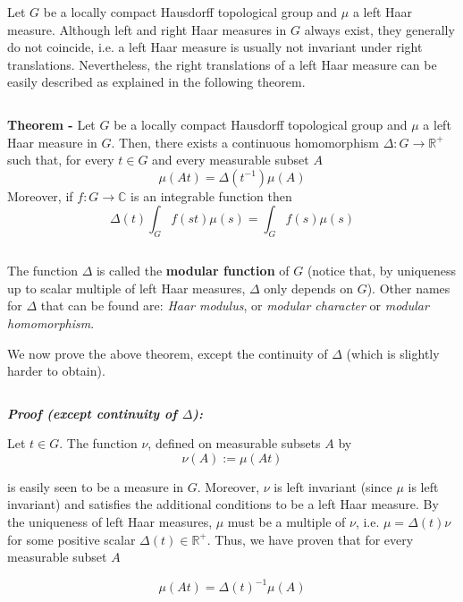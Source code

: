 \documentclass[12pt]{article}
\begin{document}
Let $G$ be a locally compact Hausdorff topological group and $\mu$ a left Haar measure. Although left and right Haar measures in $G$ always exist, they generally do not coincide, i.e. a left Haar measure is usually not invariant under right translations. Nevertheless, the right translations of a left Haar measure can be easily described as explained in the following theorem.

$\,$

{\bf Theorem -} Let $G$ be a locally compact Hausdorff topological group and $\mu$ a left Haar measure in $G$. Then, there exists a continuous homomorphism $\Delta:G \longrightarrow \mathbb{R}^+$ such that, for every $t \in G$ and every measurable subset $A$
\begin{displaymath}
\mu(At) = \Delta(t^{-1})\mu(A)
\end{displaymath}
Moreover, if $f:G \longrightarrow \mathbb{C}$ is an integrable function then
\begin{displaymath}
\Delta(t)\int_Gf(st) \mu(s) = \int_G f(s) \mu(s)
\end{displaymath}

$\,$

The function $\Delta$ is called the {\bf modular function} of $G$ (notice that, by uniqueness up to scalar multiple of left Haar measures, $\Delta$ only depends on $G$). Other names for $\Delta$ that can be found are: \emph{Haar modulus}, or \emph{modular character} or \emph{modular homomorphism}.

We now prove the above theorem, except the continuity of $\Delta$ (which is slightly harder to obtain).

$\,$

{\bf \emph{Proof (except continuity of $\Delta$):}}

Let $t \in G$. The function $\nu$, defined on measurable subsets $A$ by
\begin{displaymath}
\nu (A):= \mu(At)
\end{displaymath}

is easily seen to be a measure in $G$. Moreover, $\nu$ is left invariant (since $\mu$ is left invariant) and satisfies the additional conditions to be a left Haar measure. By the uniqueness of left Haar measures, $\mu$ must be a multiple of $\nu$, i.e. $\mu=\Delta(t)\nu$ for some positive scalar $\Delta(t) \in \mathbb{R}^+$. Thus, we have proven that for every measurable subset $A$

\begin{displaymath}
\mu(At)= \Delta(t)^{-1}\mu(A)
\end{displaymath}
\end{document}
